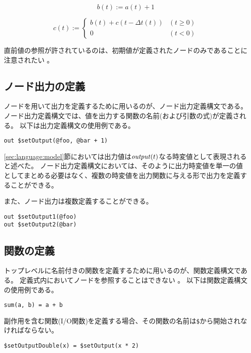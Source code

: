\begin{equation*}
  b(t) := a(t) + 1
\end{equation*}

\begin{equation*}
  c(t) := \begin{cases}
    b(t) + c(t-\Delta t(t)) & (t \geq 0) \\
    0 & (t < 0)
  \end{cases}
\end{equation*}

直前値の参照が許されているのは、初期値が定義されたノードのみであることに注意されたい \footnotemark[1]。

\subsection{ノード出力の定義}
ノードを用いて出力を定義するために用いるのが、ノード出力定義構文である。
ノード出力定義構文では、値を出力する関数の名前(および引数の式)が定義される。
以下は出力定義構文の使用例である。
\begin{lstlisting}[basicstyle=\ttfamily\small,language=SFRP]
out $setOutput(@foo, @bar + 1)
\end{lstlisting}

\ref{sec:language:model}節においては出力値は${\it output}(t)$なる時変値として表現されると述べた。
ノード出力定義構文においては、そのように出力時変値を単一の値としてまとめる必要はなく、複数の時変値を出力関数に与える形で出力を定義することができる。

また、ノード出力は複数定義することができる。
\begin{lstlisting}[basicstyle=\ttfamily\small,language=SFRP]
out $setOutput1(@foo)
out $setOutput2(@bar)
\end{lstlisting}

\subsection{関数の定義}
トップレベルに名前付きの関数を定義するために用いるのが、関数定義構文である。
定義式内においてノードを参照することはできない \footnotemark[1]。
以下は関数定義構文の使用例である。
\begin{lstlisting}[basicstyle=\ttfamily\small,language=SFRP]
sum(a, b) = a + b
\end{lstlisting}

副作用を含む関数(I/O関数)を定義する場合、その関数の名前は\texttt{\$}から開始されなければならない。
\begin{lstlisting}[basicstyle=\ttfamily\small,language=SFRP]
$setOutputDouble(x) = $setOutput(x * 2)
\end{lstlisting}

